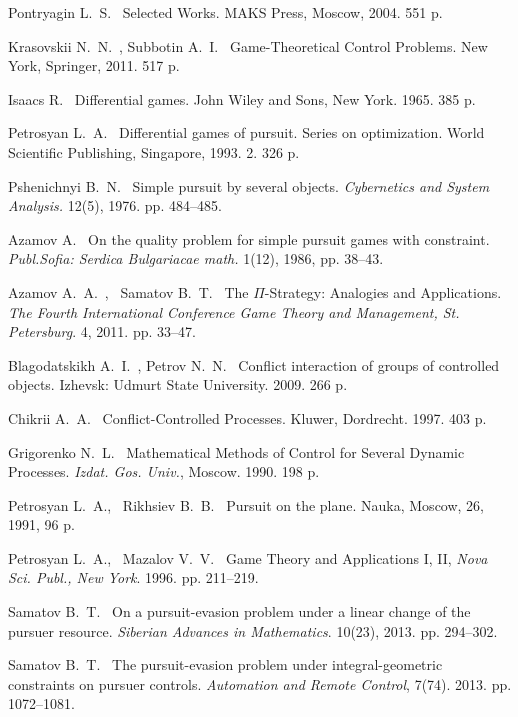 \documentclass[10 pt]{book}
\begin{document}
\begin{enumerate}
 \textsf{Pontryagin L.~S.~} Selected Works. MAKS Press, Moscow, 2004. 551 p.

 \textsf{Krasovskii N.~N.~, Subbotin A.~I.~} Game-Theoretical Control Problems. New York, Springer, 2011. 517 p.

 \textsf{Isaacs R.~} Differential games. John Wiley and Sons, New York. 1965. 385 p.

 \textsf{Petrosyan L.~A.~} Differential games of pursuit. Series on
optimization. World Scientific Publishing, Singapore, 1993. 2. 326 p.

 \textsf{Pshenichnyi B.~N.~}  Simple pursuit by several objects. \textit{Cybernetics and System Analysis.} 12(5), 1976.  pp. 484--485.

 \textsf{Azamov A.~} On the quality problem for simple pursuit games with
constraint. \textit{Publ.Sofia: Serdica Bulgariacae math.} 1(12), 1986, pp. 38--43.

 \textsf{Azamov A.~A.~, \ Samatov B.~T.~} The $\Pi$-Strategy: Analogies and
Applications. \textit{The Fourth International Conference Game Theory and Management, St. Petersburg}. 4, 2011.  pp. 33--47.

 \textsf{Blagodatskikh A.~I.~, Petrov N.~N.~} Conflict interaction of
groups of controlled objects. Izhevsk: Udmurt State University. 2009. 266 p.

 \textsf{Chikrii A.~A.~} Conflict-Controlled Processes. Kluwer, Dordrecht. 1997. 403 p.

 \textsf{Grigorenko N.~L.~} Mathematical Methods of Control for Several Dynamic Processes. \textit{Izdat. Gos. Univ.}, Moscow.  1990. 198 p.

 \textsf{Petrosyan L.~A.,~ Rikhsiev B.~B.~} Pursuit on the plane. Nauka, Moscow, 26, 1991,  96 p.

 \textsf{Petrosyan L.~A.,~ Mazalov V.~V.~}  Game Theory and Applications I, II, \textit{Nova Sci. Publ., New York}. 1996. pp. 211--219.

 \textsf{Samatov B.~T.~} On a pursuit-evasion problem under a linear change
of the pursuer resource. \textit{Siberian Advances in Mathematics}.  10(23), 2013. pp. 294--302.

 \textsf{Samatov B.~T.~} The pursuit-evasion problem under integral-geometric constraints on pursuer controls.
\textit{Automation and Remote Control}, 7(74). 2013. pp. 1072--1081.


\end{enumerate}
\end{document}
